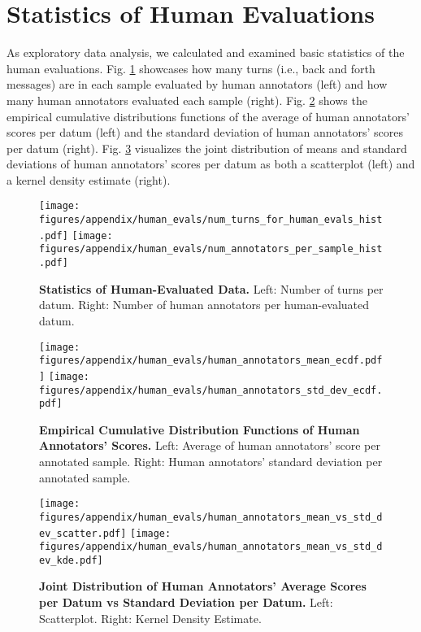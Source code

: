 \clearpage
\section{Statistics of Human Evaluations}

As exploratory data analysis, we calculated and examined basic statistics of the human evaluations. Fig. \ref{app:fig:human_evaluations_number_of_turns_per_annotated_sample} showcases how many turns (i.e., back and forth messages) are in each sample evaluated by human annotators (left)  and how many human annotators evaluated each sample (right). Fig. \ref{app:fig:human_annotator_scores_mean_std_dev_ecdfs} shows the empirical cumulative distributions functions of the average of human annotators' scores per datum (left) and the standard deviation of human annotators' scores per datum (right). Fig. \ref{app:fig:human_annotator_scores_means_vs_std_dev_scatter_and_kde} visualizes the joint distribution of means and standard deviations of human annotators' scores per datum as both a scatterplot (left) and a kernel density estimate (right).

\begin{figure}[h!]
    \centering
    \texttt{[image: figures/appendix/human\_evals/num\_turns\_for\_human\_evals\_hist.pdf]}%
    \texttt{[image: figures/appendix/human\_evals/num\_annotators\_per\_sample\_hist.pdf]}
    \caption{\textbf{Statistics of Human-Evaluated Data.} Left: Number of turns per datum. Right: Number of human annotators per human-evaluated datum.}
    \label{app:fig:human_evaluations_number_of_turns_per_annotated_sample}
\end{figure}


\begin{figure}[h!]
    \centering
    \texttt{[image: figures/appendix/human\_evals/human\_annotators\_mean\_ecdf.pdf]}%
    \texttt{[image: figures/appendix/human\_evals/human\_annotators\_std\_dev\_ecdf.pdf]}
    \caption{\textbf{Empirical Cumulative Distribution Functions of Human Annotators' Scores.} Left: Average of human annotators' score per annotated sample. Right: Human annotators' standard deviation per annotated sample. }
    \label{app:fig:human_annotator_scores_mean_std_dev_ecdfs}
\end{figure}

\begin{figure}[h!]
    \centering
    \texttt{[image: figures/appendix/human\_evals/human\_annotators\_mean\_vs\_std\_dev\_scatter.pdf]}%
    \texttt{[image: figures/appendix/human\_evals/human\_annotators\_mean\_vs\_std\_dev\_kde.pdf]}
    \caption{\textbf{Joint Distribution of Human Annotators' Average Scores per Datum vs Standard Deviation per Datum.} Left: Scatterplot. Right: Kernel Density Estimate.}
    \label{app:fig:human_annotator_scores_means_vs_std_dev_scatter_and_kde}
\end{figure}

